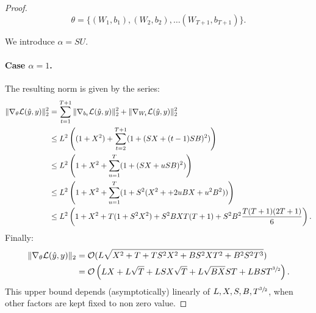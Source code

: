 \begin{proof}
    \begin{equation}
        \theta=\{(W_1,b_1), (W_2, b_2),\ldots (W_{T+1},b_{T+1})\}.
    \end{equation}
    
    We introduce $\alpha=SU$.  
    
    \paragraph{Case $\alpha=1$.}
    The resulting norm is given by the series:
    \begin{align}
        \|\nabla_{\theta}\mathcal{L}(\hat y,y)\|^2_2&= \sum_{t=1}^{T+1}\|\nabla_{b_t}\mathcal{L}(\hat y,y)\|^2_2+\|\nabla_{W_t}\mathcal{L}(\hat y,y)\|^2_2\\
                      &\leq L^2\left((1+X^2)+\sum_{t=2}^{T+1}(1+(SX+(t-1)SB)^2)\right)\\
                      &\leq L^2\left(1+X^2+\sum_{u=1}^{T}(1+(SX+uSB)^2)\right)\\
                      &\leq L^2\left(1+X^2+\sum_{u=1}^{T}(1+S^2(X^2++2uBX+u^2B^2))\right)\\
                      &\leq L^2\left(1+X^2+T(1+S^2X^2)+S^2BXT(T+1)+S^2B^2\frac{T(T+1)(2T+1)}{6}\right).
    \end{align}
    Finally:
    \begin{align}
        \|\nabla_{\theta}\mathcal{L}(\hat y,y)\|_2 &= \mathcal{O}(L\sqrt{X^2+T+TS^2X^2+BS^2XT^2+B^2S^2T^3})\\
        &= \mathcal{O}\left(LX+L\sqrt{T}+LSX\sqrt{T}+L\sqrt{BX}ST+LBST^{\sfrac{3}{2}}\right).
    \end{align}
    This upper bound depends (asymptotically) linearly of $L,X,S,B,T^{\sfrac{3}{2}}$, when other factors are kept fixed to non zero value.  
    

\end{proof}
